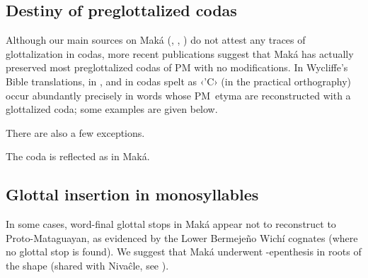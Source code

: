 \subsection{Destiny of preglottalized codas}\label{mk-deglottalization-codas}
Although our main sources on Maká (, \citeyear{AG94}, \citeyear{AG99}) do not attest any traces of glottalization in codas, more recent publications suggest that Maká has actually preserved most preglottalized codas of PM with no modifications. In Wycliffe's Bible translations, in \citet{unuuneiki}, and in \citet{maka-etnomat,PMA} codas spelt as ‹'C› (in the practical orthography) occur abundantly precisely in words whose PM~etyma are reconstructed with a glottalized coda; some examples are given below.

\begin{exe}
    \ex \burnalh
    \ex \stingerits
    \ex \sonits
    \ex \bite
    \ex \rightn
    \ex \firef
    \ex \sandisaj
    \ex \takeaway
    \ex \answer
    \ex \runv
    \ex \grabwork
    \ex \dividev
    \ex \winter
    \ex {}
    \ex \abdcavity
    \ex \suckb
    \ex \up
    \ex \sprout
    \ex \throwv
    \ex \climb
    \ex \night
    \ex \spring
    \ex \meatitssg
\end{exe}

There are also a few exceptions.

\begin{exe}
    \ex \rootn
    \ex \palm
    \ex \spinsew
    \ex \nest
    \ex \badmood
    \ex \paralytic
\end{exe}

The coda  is reflected as  in Maká.

\begin{exe}
    \ex \weave
    \ex \soundv
    \ex \marry
\end{exe}

\subsection{Glottal insertion in monosyllables}\label{mk-glottal-insertion}

In some cases, word-final glottal stops in Maká appear not to reconstruct to Proto-Mataguayan, as evidenced by the Lower Bermejeño Wichí cognates (where no glottal stop is found). We suggest that Maká underwent \mbox{-}epenthesis in roots of the shape  (shared with Nivaĉle, see ).

\begin{exe}
    \ex \thorne
    \ex \hornclub
    \ex \sleep
    \ex \juice
\end{exe}

